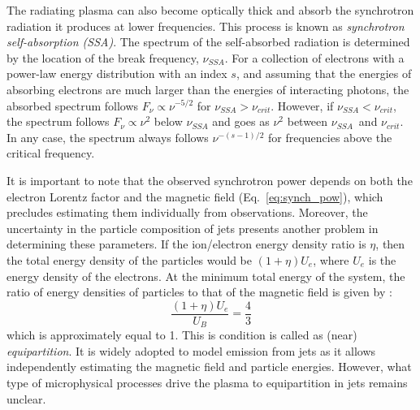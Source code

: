 The radiating plasma can also become optically thick and absorb the synchrotron radiation it produces at lower frequencies. This process is known as \textit{synchrotron self-absorption (SSA)}. The spectrum of the self-absorbed radiation is determined by the location of the break frequency, $\nu_{SSA}$. For a collection of electrons with a power-law energy distribution with an index $s$, and assuming that the energies of absorbing electrons are much larger than the energies of interacting photons, the absorbed spectrum follows $F_\nu\propto \nu^{-5/2}$ for $\nu_{SSA}>\nu_{crit}$. However, if $\nu_{SSA}<\nu_{crit}$, the spectrum follows $F_\nu\propto \nu^{2}$ below $\nu_{SSA}$ and goes as $\nu^2$ between $\nu_{SSA}$~and $\nu_{crit}$. In any case, the spectrum always follows $\nu^{-(s-1)/2}$ for frequencies above the critical frequency.

It is important to note that the observed synchrotron power depends on both the electron Lorentz factor and the magnetic field (Eq.~\ref{eq:synch_pow}), which precludes estimating them individually from observations. Moreover, the uncertainty in the particle composition of jets presents another problem in determining these parameters. If the ion/electron energy density ratio is $\eta$, then the total energy density of the particles would be $(1+\eta)U_e$, where $U_e$ is the energy density of the electrons. At the minimum total energy of the system, the ratio of energy densities of particles to that of the magnetic field is given by \citep{longair_2011}:
\begin{equation}
    \frac{(1+\eta)U_e}{U_B}=\frac{4}{3}
\end{equation}
which is approximately equal to 1. This is condition is called as (near) \textit{equipartition}. It is widely adopted to model emission from jets as it allows independently estimating the magnetic field and particle energies. However, what type of microphysical processes drive the plasma to equipartition in jets remains unclear.


